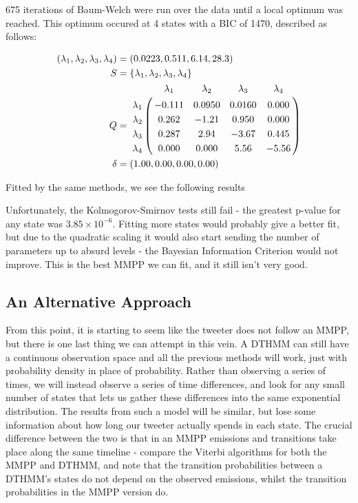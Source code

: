 675 iterations of Baum-Welch were run over the data until a local optimum was reached. This optimum occured at 4 states with a BIC of 1470, described as follows:

\begin{align*}
(\lambda_1,\lambda_2,\lambda_3,\lambda_4) &= (0.0223,0.511,6.14,28.3)\\
S &= \{\lambda_1,\lambda_2,\lambda_3,\lambda_4\}\\
Q &= \bordermatrix{      & \lambda_1 & \lambda_2 & \lambda_3 & \lambda_4\cr
                \lambda_1 & -0.111 & 0.0950 & 0.0160 & 0.000 \cr
                \lambda_2 & 0.262  & -1.21  & 0.950  & 0.000 \cr
                \lambda_3 & 0.287  & 2.94   & -3.67  & 0.445 \cr
                \lambda_4 & 0.000  & 0.000  & 5.56   & -5.56 \cr
			}\\
\delta &= (1.00,0.00,0.00,0.00)
\end{align*}

Fitted by the same methods, we see the following results


Unfortunately, the Kolmogorov-Smirnov tests still fail - the greatest p-value for any state was $3.85 \times 10^{-6}$. Fitting more states would probably give a better fit, but due to the quadratic scaling it would also start sending the number of parameters up to absurd levels - the Bayesian Information Criterion would not improve. This is the best MMPP we can fit, and it still isn't very good.

\subsection{An Alternative Approach}

From this point, it is starting to seem like the tweeter does not follow an MMPP, but there is one last thing we can attempt in this vein. A DTHMM can still have a continuous observation space and all the previous methods will work, just with probability density in place of probability. Rather than observing a series of times, we will instead observe a series of time differences, and look for any small number of states that lets us gather these differences into the same exponential distribution. The results from such a model will be similar, but lose some information about how long our tweeter actually spends in each state. The crucial difference between the two is that in an MMPP emissions and transitions take place along the same timeline - compare the Viterbi algorithms for both the MMPP and DTHMM, and note that the transition probabilities between a DTHMM's states do not depend on the observed emissions, whilst the transition probabilities in the MMPP version do.

